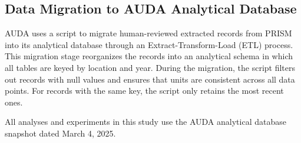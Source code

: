 \subsection{Data Migration to AUDA Analytical Database}

AUDA uses a script to migrate human-reviewed extracted records from PRISM into its analytical database through an Extract-Transform-Load (ETL) process. This migration stage reorganizes the records into an analytical schema in which all tables are keyed by location and year. During the migration, the script filters out records with null values and ensures that units are consistent across all data points. For records with the same key, the script only retains the most recent ones.

All analyses and experiments in this study use the AUDA analytical database snapshot dated March 4, 2025.
